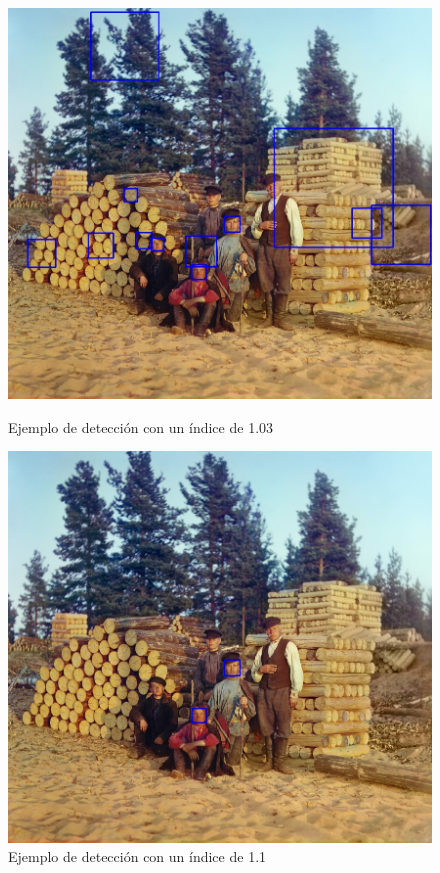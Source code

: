 \documentclass[a4paper]{article}
\begin{document}
\begin{figure}[h!]
    \centering
    \begin{minipage}[b]{0.48\textwidth}
        \includegraphics[width=\textwidth]{../img/woodcutters_face_detection103.jpg}
        \caption{Ejemplo de detección con un índice de 1.03}
    \end{minipage}
    \hfill
    \begin{minipage}[b]{0.48\textwidth}
        \includegraphics[width=\textwidth]{../img/woodcutters_face_detection11.jpg}
        \caption{Ejemplo de detección con un índice de 1.1}
    \end{minipage}
\end{figure}
\end{document}
